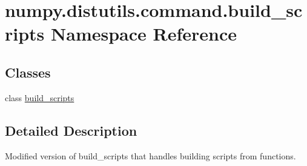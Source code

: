 \hypertarget{namespacenumpy_1_1distutils_1_1command_1_1build__scripts}{}\section{numpy.\+distutils.\+command.\+build\+\_\+scripts Namespace Reference}
\label{namespacenumpy_1_1distutils_1_1command_1_1build__scripts}
\subsection*{Classes}
\begin{DoxyCompactItemize}
\item 
class \hyperlink{classnumpy_1_1distutils_1_1command_1_1build__scripts_1_1build__scripts}{build\+\_\+scripts}
\end{DoxyCompactItemize}


\subsection{Detailed Description}
\begin{DoxyVerb}Modified version of build_scripts that handles building scripts from functions.\end{DoxyVerb}
 